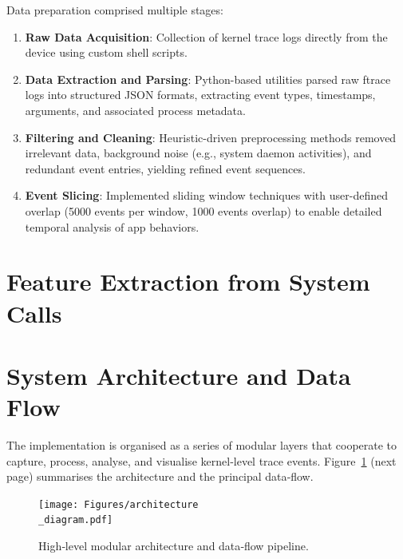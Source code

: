 \documentclass[a4paper,12pt]{report}
\begin{document}
Data preparation comprised multiple stages:
\begin{enumerate}
\item \textbf{Raw Data Acquisition}: Collection of kernel trace logs directly from the device using custom shell scripts.
\item \textbf{Data Extraction and Parsing}: Python-based utilities parsed raw ftrace logs into structured JSON formats, extracting event types, timestamps, arguments, and associated process metadata.
\item \textbf{Filtering and Cleaning}: Heuristic-driven preprocessing methods removed irrelevant data, background noise (e.g., system daemon activities), and redundant event entries, yielding refined event sequences.
\item \textbf{Event Slicing}: Implemented sliding window techniques with user-defined overlap (5000 events per window, 1000 events overlap) to enable detailed temporal analysis of app behaviors.
\end{enumerate}

\section{Feature Extraction from System Calls}


\section{System Architecture and Data Flow}
The implementation is organised as a series of modular layers that cooperate to capture, process, analyse, and visualise kernel‑level trace events. Figure~\ref{fig:architecture} (next page) summarises the architecture and the principal data‑flow.

\begin{figure}[ht]
\centering
\texttt{[image: Figures/architecture\\\_diagram.pdf]}
\caption{High‑level modular architecture and data‑flow pipeline.}
\label{fig:architecture}
\end{figure}
\end{document}
